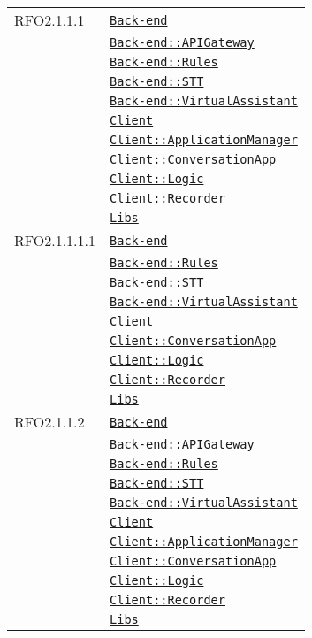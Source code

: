 \begin{longtable}{|>{\centering}m{3cm}|m{10cm}<{\centering}|}
RFO2.1.1.1 & \hyperref[Back-end]{\texttt{Back-end}}\\
& \hyperref[Back-end::APIGateway]{\texttt{Back-end::APIGateway}}\\
& \hyperref[Back-end::Rules]{\texttt{Back-end::Rules}}\\
& \hyperref[Back-end::STT]{\texttt{Back-end::STT}}\\
& \hyperref[Back-end::VirtualAssistant]{\texttt{Back-end::VirtualAssistant}}\\
& \hyperref[Client]{\texttt{Client}}\\
& \hyperref[Client::ApplicationManager]{\texttt{Client::ApplicationManager}}\\
& \hyperref[Client::ConversationApp]{\texttt{Client::ConversationApp}}\\
& \hyperref[Client::Logic]{\texttt{Client::Logic}}\\
& \hyperref[Client::Recorder]{\texttt{Client::Recorder}}\\
& \hyperref[Libs]{\texttt{Libs}}\\ \hline

RFO2.1.1.1.1 & \hyperref[Back-end]{\texttt{Back-end}}\\
& \hyperref[Back-end::Rules]{\texttt{Back-end::Rules}}\\
& \hyperref[Back-end::STT]{\texttt{Back-end::STT}}\\
& \hyperref[Back-end::VirtualAssistant]{\texttt{Back-end::VirtualAssistant}}\\
& \hyperref[Client]{\texttt{Client}}\\
& \hyperref[Client::ConversationApp]{\texttt{Client::ConversationApp}}\\
& \hyperref[Client::Logic]{\texttt{Client::Logic}}\\
& \hyperref[Client::Recorder]{\texttt{Client::Recorder}}\\
& \hyperref[Libs]{\texttt{Libs}}\\ \hline

RFO2.1.1.2 & \hyperref[Back-end]{\texttt{Back-end}}\\
& \hyperref[Back-end::APIGateway]{\texttt{Back-end::APIGateway}}\\
& \hyperref[Back-end::Rules]{\texttt{Back-end::Rules}}\\
& \hyperref[Back-end::STT]{\texttt{Back-end::STT}}\\
& \hyperref[Back-end::VirtualAssistant]{\texttt{Back-end::VirtualAssistant}}\\
& \hyperref[Client]{\texttt{Client}}\\
& \hyperref[Client::ApplicationManager]{\texttt{Client::ApplicationManager}}\\
& \hyperref[Client::ConversationApp]{\texttt{Client::ConversationApp}}\\
& \hyperref[Client::Logic]{\texttt{Client::Logic}}\\
& \hyperref[Client::Recorder]{\texttt{Client::Recorder}}\\
& \hyperref[Libs]{\texttt{Libs}}\\ \hline


\end{longtable}
